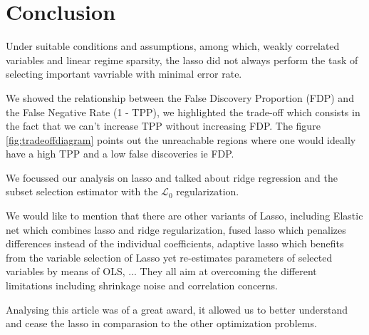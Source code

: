 \documentclass[10pt,onecolumn,letterpaper]{article}
\begin{document}
\section{Conclusion}


Under suitable conditions and assumptions, among which, weakly correlated variables and linear regime sparsity, the lasso did not always perform the task of selecting important vavriable with minimal error rate.
\newline 

We showed the relationship between the False Discovery Proportion (FDP) and the False Negative Rate (1 - TPP), we highlighted the trade-off which consists in the fact that we can't increase TPP without increasing FDP. The figure \ref{fig:tradeoffdiagram} points out the unreachable regions where one would ideally have a high TPP and a low false discoveries ie FDP.
\newline 

We focussed our analysis on lasso and talked about ridge regression and the subset selection estimator with the $\mathcal{L}_0$ regularization. 

We would like to mention that there are other variants of Lasso, including Elastic net which combines lasso and ridge regularization, fused lasso which penalizes differences instead of the individual coefficients, adaptive lasso which benefits from the variable selection of Lasso yet re-estimates parameters of selected variables by means of OLS, ... They all aim at overcoming the different limitations including shrinkage noise and correlation concerns.
\newline

Analysing this article was of a great award, it allowed us to better understand and cease the lasso in comparasion to the other optimization problems. 
\end{document}
